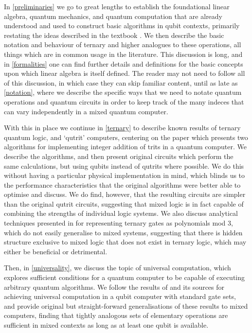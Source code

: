 In \autoref{preliminaries} we go to great lengths to establish the foundational linear algebra, quantum mechanics, and quantum computation that are already understood and used to construct basic algorithms in qubit contexts, primarily restating the ideas described in the textbook \cite{textbook}. We then describe the basic notation and behaviour of ternary and higher analogues to these operations, all things which are in common usage in the literature. This discussion is long, and in \autoref{formalities} one can find further details and definitions for the basic concepts upon which linear algebra is itself defined. The reader may not need to follow all of this discussion, in which case they can skip familiar content, until as late as \autoref{notation}, where we describe the specific ways that we need to notate quantum operations and quantum circuits in order to keep track of the many indeces that can vary independently in a mixed quantum computer.

With this in place we continue in \autoref{ternary} to describe known results of ternary quantum logic, and `qutrit' computers, centering on the paper \cite{arithmetics} which presents two algorithms for implementing integer addition of trits in a quantum computer. We describe the algorithms, and then present original circuits which perform the same calculations, but using qubits instead of qutrits where possible. We do this without having a particular physical implementation in mind, which blinds us to the performance characteristics that the original algorithms were better able to optimise and discuss. We do find, however, that the resulting circuits are simpler than the original qutrit circuits, suggesting that mixed logic is in fact capable of combining the strengths of individual logic systems. We also discuss analytical techniques presented in \cite{arithmetics} for representing ternary gates as polynomials mod 3, which do not easily generalise to mixed systems, suggesting that there is hidden structure exclusive to mixed logic that does not exist in ternary logic, which may either be beneficial or detrimental.

Then, in \autoref{universality}, we discuss the topic of universal computation, which explores sufficient conditions for a quantum computer to be capable of executing arbitrary quantum algorithms. We follow the results of \cite{textbook} and its sources \cite{cnot-decomposition, universal-qubit} for achieving universal computation in a qubit computer with standard gate sets, and provide original but straight-forward generalisations of these results to mixed computers, finding that tightly analogous sets of elementary operations are sufficient in mixed contexts as long as at least one qubit is available.

